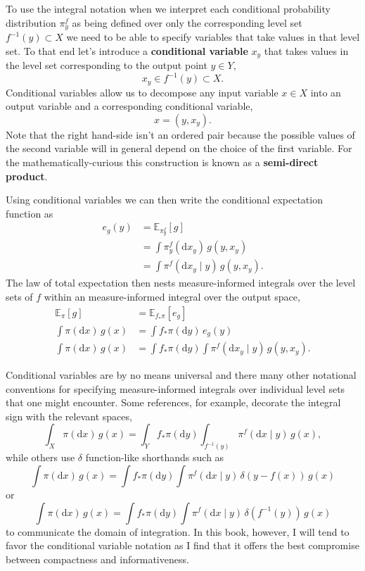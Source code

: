 \documentclass[
  letterpaper,
  DIV=11,
  numbers=noendperiod]{scrartcl}
\begin{document}
To use the integral notation when we interpret each conditional
probability distribution \(\pi^{f}_{y}\) as being defined over only the
corresponding level set \(f^{-1}(y) \subset X\) we need to be able to
specify variables that take values in that level set. To that end let's
introduce a \textbf{conditional variable} \(x_{y}\) that takes values in
the level set corresponding to the output point \(y \in Y\), \[
x_{y} \in f^{-1}(y) \subset X.
\] Conditional variables allow us to decompose any input variable
\(x \in X\) into an output variable and a corresponding conditional
variable, \[
x = (y, x_{y}).
\] Note that the right hand-side isn't an ordered pair because the
possible values of the second variable will in general depend on the
choice of the first variable. For the mathematically-curious this
construction is known as a \textbf{semi-direct product}.

Using conditional variables we can then write the conditional
expectation function as \begin{align*}
e_{g}(y)
&=
\mathbb{E}_{ \pi^{f}_{y} } \! \left[  g  \right]
\\
&=
\int \pi^{f}_{y}( \mathrm{d} x_{y} ) \, g(y, x_{y})
\\
&=
\int \pi^{f}( \mathrm{d} x_{y} \mid y ) \, g(y, x_{y}).
\end{align*} The law of total expectation then nests measure-informed
integrals over the level sets of \(f\) within an measure-informed
integral over the output space, \begin{align*}
\mathbb{E}_{\pi} \! \left[ g \right]
&=
\mathbb{E}_{ f_{*} \pi } \! \left[ e_{g} \right]
\\
\int \pi( \mathrm{d} x ) \, g(x)
&=
\int f_{*} \pi (\mathrm{d} y) \, e_{g}(y)
\\
\int \pi( \mathrm{d} x ) \, g(x)
&=
\int f_{*} \pi (\mathrm{d} y)
\int \pi^{f}( \mathrm{d} x_{y} \mid y ) \, g(y, x_{y}).
\end{align*}

Conditional variables are by no means universal and there many other
notational conventions for specifying measure-informed integrals over
individual level sets that one might encounter. Some references, for
example, decorate the integral sign with the relevant spaces, \[
\int_{X} \pi( \mathrm{d} x ) \, g(x)
=
\int_{Y} f_{*} \pi (\mathrm{d} y)
\int_{f^{-1}(y)} \pi^{f}( \mathrm{d} x \mid y ) \, g(x),
\] while others use \(\delta\) function-like shorthands such as \[
\int \pi( \mathrm{d} x ) \, g(x)
=
\int f_{*} \pi (\mathrm{d} y)
\int \pi^{f}( \mathrm{d} x \mid y ) \, \delta(y - f(x)) \, g(x)
\] or \[
\int \pi( \mathrm{d} x ) \, g(x)
=
\int f_{*} \pi (\mathrm{d} y)
\int \pi^{f}( \mathrm{d} x \mid y ) \, \delta(f^{-1}(y)) \, g(x)
\] to communicate the domain of integration. In this book, however, I
will tend to favor the conditional variable notation as I find that it
offers the best compromise between compactness and informativeness.
\end{document}
